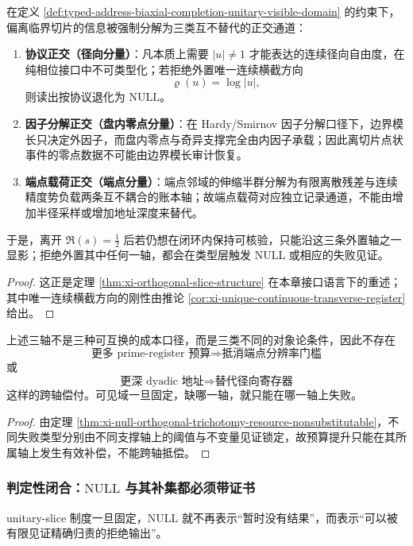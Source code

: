 \begin{theorem}[正交切片定理]\label{thm:typed-address-biaxial-completion-orthogonal-slice}
在定义 \ref{def:typed-address-biaxial-completion-unitary-visible-domain} 的约束下，偏离临界切片的信息被强制分解为三类互不替代的正交通道：
\begin{enumerate}
  \item \textbf{协议正交（径向分量）}：凡本质上需要 \(|u|\neq 1\) 才能表达的连续径向自由度，在纯相位接口中不可类型化；若拒绝外置唯一连续横截方向
  \[
  \varrho(u)=\log|u|,
  \]
  则读出按协议退化为 \(\mathrm{NULL}\)。
  \item \textbf{因子分解正交（盘内零点分量）}：在 Hardy/Smirnov 因子分解口径下，边界模长只决定外因子，而盘内零点与奇异支撑完全由内因子承载；因此离切片点状事件的零点数据不可能由边界模长审计恢复。
  \item \textbf{端点载荷正交（端点分量）}：端点邻域的伸缩半群分解为有限离散残差与连续精度势负载两条互不耦合的账本轴；故端点载荷对应独立记录通道，不能由增加半径采样或增加地址深度来替代。
\end{enumerate}
于是，离开 \(\Re(s)=\tfrac12\) 后若仍想在闭环内保持可核验，只能沿这三条外置轴之一显影；拒绝外置其中任何一轴，都会在类型层触发 \(\mathrm{NULL}\) 或相应的失败见证。
\end{theorem}
\begin{proof}
这正是定理 \ref{thm:xi-orthogonal-slice-structure} 在本章接口语言下的重述；其中唯一连续横截方向的刚性由推论 \ref{cor:xi-unique-continuous-transverse-register} 给出。
\end{proof}

\begin{corollary}[预算不可互偿]\label{cor:typed-address-biaxial-completion-orthogonal-budget}
上述三轴不是三种可互换的成本口径，而是三类不同的对象论条件，因此不存在
\[
\text{更多 prime-register 预算}\Rightarrow\text{抵消端点分辨率门槛}
\]
或
\[
\text{更深 dyadic 地址}\Rightarrow\text{替代径向寄存器}
\]
这样的跨轴偿付。可见域一旦固定，缺哪一轴，就只能在哪一轴上失败。
\end{corollary}
\begin{proof}
由定理 \ref{thm:xi-null-orthogonal-trichotomy-resource-nonsubstitutable}，不同失败类型分别由不同支撑轴上的阈值与不变量见证锁定，故预算提升只能在其所属轴上发生有效补偿，不能跨轴抵偿。
\end{proof}

\subsubsection{判定性闭合：\texorpdfstring{$\mathrm{NULL}$}{NULL} 与其补集都必须带证书}\label{subsubsec:typed-address-biaxial-completion-decidability}
unitary-slice 制度一旦固定，\(\mathrm{NULL}\) 就不再表示“暂时没有结果”，而表示“可以被有限见证精确归责的拒绝输出”。

